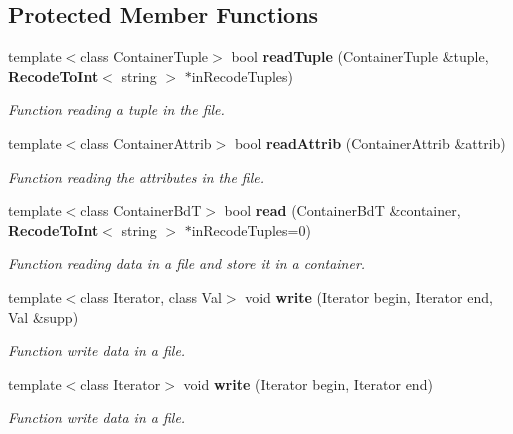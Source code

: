 \subsection*{Protected Member Functions}
\begin{CompactItemize}
\item 
template$<$class Container\-Tuple$>$ bool {\bf read\-Tuple} (Container\-Tuple \&tuple, {\bf Recode\-To\-Int}$<$ string $>$ $\ast$in\-Recode\-Tuples)
\begin{CompactList}\small\item\em Function reading a tuple in the file. \item\end{CompactList}\item 
template$<$class Container\-Attrib$>$ bool {\bf read\-Attrib} (Container\-Attrib \&attrib)
\begin{CompactList}\small\item\em Function reading the attributes in the file. \item\end{CompactList}\item 
template$<$class Container\-Bd\-T$>$ bool {\bf read} (Container\-Bd\-T \&container, {\bf Recode\-To\-Int}$<$ string $>$ $\ast$in\-Recode\-Tuples=0)
\begin{CompactList}\small\item\em Function reading data in a file and store it in a container. \item\end{CompactList}\item 
template$<$class Iterator, class Val$>$ void {\bf write} (Iterator begin, Iterator end, Val \&supp)
\begin{CompactList}\small\item\em Function write data in a file. \item\end{CompactList}\item 
template$<$class Iterator$>$ void {\bf write} (Iterator begin, Iterator end)
\begin{CompactList}\small\item\em Function write data in a file. \item\end{CompactList}\end{CompactItemize}
